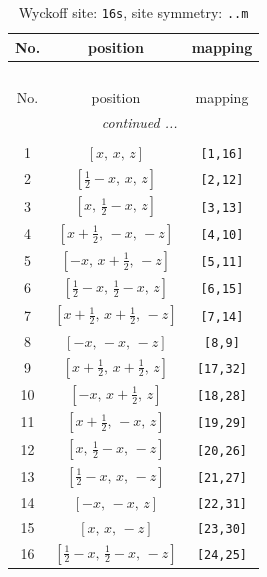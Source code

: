 \documentclass[fleqn,8pt]{jsarticle}
\begin{document}
\renewcommand{\arraystretch}{1.2}
\begin{longtable}{ccc}
\caption{Wyckoff site: {\tt 16s}, site symmetry: {\tt ..m}}
 \\
 \hline \hline
No. & position & mapping \\ \hline \endfirsthead

\multicolumn{2}{l}{\tablename\ \thetable{}} \\
 \hline \hline
No. & position & mapping \\ \hline \endhead

 \hline \hline
\multicolumn{2}{r}{\footnotesize\it continued ...} \\ \endfoot

 \hline \hline
\multicolumn{2}{r}{} \\ \endlastfoot

1 & $\left[ x,\, x,\, z \right]$ & {\tt [1,16]} \\ \hline
2 & $\left[ \frac{1}{2} - x,\, x,\, z \right]$ & {\tt [2,12]} \\ \hline
3 & $\left[ x,\, \frac{1}{2} - x,\, z \right]$ & {\tt [3,13]} \\ \hline
4 & $\left[ x + \frac{1}{2},\, - x,\, - z \right]$ & {\tt [4,10]} \\ \hline
5 & $\left[ - x,\, x + \frac{1}{2},\, - z \right]$ & {\tt [5,11]} \\ \hline
6 & $\left[ \frac{1}{2} - x,\, \frac{1}{2} - x,\, z \right]$ & {\tt [6,15]} \\ \hline
7 & $\left[ x + \frac{1}{2},\, x + \frac{1}{2},\, - z \right]$ & {\tt [7,14]} \\ \hline
8 & $\left[ - x,\, - x,\, - z \right]$ & {\tt [8,9]} \\ \hline
9 & $\left[ x + \frac{1}{2},\, x + \frac{1}{2},\, z \right]$ & {\tt [17,32]} \\ \hline
10 & $\left[ - x,\, x + \frac{1}{2},\, z \right]$ & {\tt [18,28]} \\ \hline
11 & $\left[ x + \frac{1}{2},\, - x,\, z \right]$ & {\tt [19,29]} \\ \hline
12 & $\left[ x,\, \frac{1}{2} - x,\, - z \right]$ & {\tt [20,26]} \\ \hline
13 & $\left[ \frac{1}{2} - x,\, x,\, - z \right]$ & {\tt [21,27]} \\ \hline
14 & $\left[ - x,\, - x,\, z \right]$ & {\tt [22,31]} \\ \hline
15 & $\left[ x,\, x,\, - z \right]$ & {\tt [23,30]} \\ \hline
16 & $\left[ \frac{1}{2} - x,\, \frac{1}{2} - x,\, - z \right]$ & {\tt [24,25]} \\
\end{longtable}
\end{document}
